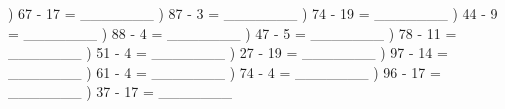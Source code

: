 \documentclass{article}%
\begin{document}
\newline%
) 67 {-} 17 = \_\_\_\_\_\_\_%
\newline%
\newline%
) 87 {-} 3 = \_\_\_\_\_\_\_%
\newline%
\newline%
) 74 {-} 19 = \_\_\_\_\_\_\_%
\newline%
\newline%
) 44 {-} 9 = \_\_\_\_\_\_\_%
\newline%
\newline%
) 88 {-} 4 = \_\_\_\_\_\_\_%
\newline%
\newline%
) 47 {-} 5 = \_\_\_\_\_\_\_%
\newline%
\newline%
) 78 {-} 11 = \_\_\_\_\_\_\_%
\newline%
\newline%
) 51 {-} 4 = \_\_\_\_\_\_\_%
\newline%
\newline%
) 27 {-} 19 = \_\_\_\_\_\_\_%
\newline%
\newline%
) 97 {-} 14 = \_\_\_\_\_\_\_%
\newline%
\newline%
) 61 {-} 4 = \_\_\_\_\_\_\_%
\newline%
\newline%
) 74 {-} 4 = \_\_\_\_\_\_\_%
\newline%
\newline%
) 96 {-} 17 = \_\_\_\_\_\_\_%
\newline%
\newline%
) 37 {-} 17 = \_\_\_\_\_\_\_%
\newline%
\newline%
\newline%
\end{document}
